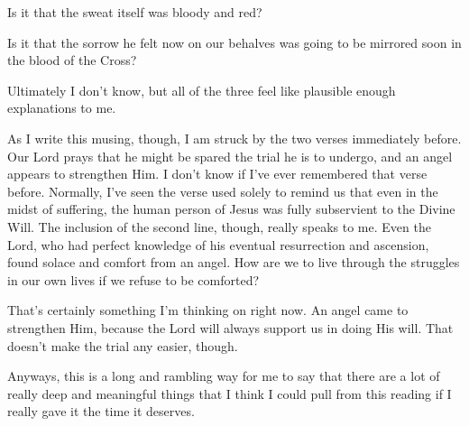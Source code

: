 \documentclass[12pt]{article}[titlepage]
\newcommand{\1}{\={a}}
\newcommand{\2}{\={e}}
\newcommand{\3}{\={\i}}
\newcommand{\4}{\=o}
\newcommand{\5}{\=u}
\newcommand{\6}{\={A}}
\renewcommand{\,}{\textsuperscript{,}}
\begin{document}
Is it that the sweat itself was bloody and red?

Is it that the sorrow he felt now on our behalves was going to be mirrored soon in the blood of the Cross?

Ultimately I don't know, but all of the three feel like plausible enough explanations to me.

As I write this musing, though, I am struck by the two verses immediately before.
Our Lord prays that he might be spared the trial he is to undergo, and an angel appears to strengthen Him.
I don't know if I've ever remembered that verse before.
Normally, I've seen the verse used solely to remind us that even in the midst of suffering, the human person of Jesus was fully subservient to the Divine Will.
The inclusion of the second line, though, really speaks to me.
Even the Lord, who had perfect knowledge of his eventual resurrection and ascension, found solace and comfort from an angel.
How are we to live through the struggles in our own lives if we refuse to be comforted?

That's certainly something I'm thinking on right now.
An angel came to strengthen Him, because the Lord will always support us in doing His will.
That doesn't make the trial any easier, though.

Anyways, this is a long and rambling way for me to say that there are a lot of really deep and meaningful things that I think I could pull from this reading if I really gave it the time it deserves.
\end{document}
